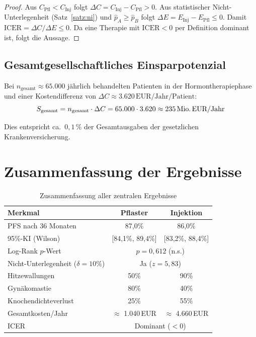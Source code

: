 ﻿\documentclass[a4paper,12pt]{article}
\theoremstyle{definition}
\begin{document}
\begin{proof}
Aus $C_{\mathrm{Pfl}} < C_{\mathrm{Inj}}$ folgt $\Delta C = C_{\mathrm{Inj}} - C_{\mathrm{Pfl}} > 0$.
Aus statistischer Nicht-Unterlegenheit (Satz~\ref{satz:ni}) und $\hat{p}_A \geq \hat{p}_B$ folgt $\Delta E = E_{\mathrm{Inj}} - E_{\mathrm{Pfl}} \leq 0$.
Damit $\mathrm{ICER} = \Delta C / \Delta E \leq 0$. Da eine Therapie mit $\mathrm{ICER} < 0$ per Definition dominant ist, folgt die Aussage. 
\end{proof}

\subsection{Gesamtgesellschaftliches Einsparpotenzial}

Bei $n_{\mathrm{gesamt}} \approx 65.000$ jährlich behandelten Patienten in der Hormontherapiephase und einer Kostendifferenz von $\Delta C \approx 3.620\,\text{EUR/Jahr/Patient}$:
\begin{equation}
  S_{\mathrm{gesamt}} = n_{\mathrm{gesamt}} \cdot \Delta C = 65.000 \cdot 3.620 \approx 235\,\text{Mio.\,EUR/Jahr}
\end{equation}

Dies entspricht ca.\ $0{,}1\,\%$ der Gesamtausgaben der gesetzlichen Krankenversicherung.

\section{Zusammenfassung der Ergebnisse}

\begin{table}[h!]
\centering
\caption{Zusammenfassung aller zentralen Ergebnisse}
\label{tab:zusammenfassung}
\begin{tabular}{lcc}
\toprule
\textbf{Merkmal} & \textbf{Pflaster} & \textbf{Injektion} \\
\midrule
PFS nach 36 Monaten & 87,0\% & 86,0\% \\
95\%-KI (Wilson) & [84,1\%, 89,4\%] & [83,2\%, 88,4\%] \\
Log-Rank $p$-Wert & \multicolumn{2}{c}{$p = 0{,}612$ (n.s.)} \\
Nicht-Unterlegenheit ($\delta=10\%$) & \multicolumn{2}{c}{Ja ($z = 5{,}83$)} \\
\midrule
Hitzewallungen & 50\% & 90\% \\
Gynäkomastie & 80\% & 40\% \\
Knochendichteverlust & 25\% & 55\% \\
\midrule
Gesamtkosten/Jahr & $\approx$ 1.040\,EUR & $\approx$ 4.660\,EUR \\
ICER & \multicolumn{2}{c}{Dominant ($<0$)} \\
\bottomrule
\end{tabular}
\end{table}
\end{document}
